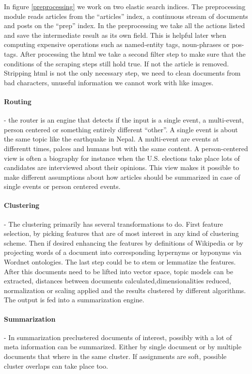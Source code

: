   In figure \ref{preprocessing} we work on two elastic search indices. The preprocessing module reads articles from the ``articles'' index, a continuous stream of documents and posts on the ``prep'' index. In the preprocessing we take all the actions listed and save the intermediate result as its own field. This is helpful later when computing expensive operations such as named-entity tags, noun-phrases or pos-tags. After processing the html we take a second filter step to make sure that the conditions of the scraping steps still hold true. If not the article is removed. Stripping html is not the only necessary step, we need to clean documents from bad characters, unuseful information we cannot work with like images.

  \paragraph{Routing} - the router is an engine that detects if the input is a single event, a multi-event, person centered or something entirely different ``other''. A single event is about the same topic like the earthquake in Nepal. A multi-event are events at differentt times, palces and humans but with the same content. A person-centered view is often a biography for instance when the U.S. elections take place lots of candidates are interviewed about their opinions. This view makes it possible to make different assumptions about how articles should be summarized in case of single events or person centered events.

  \paragraph{Clustering} - The clustering primarily has several transformations to do. First  feature selection, by picking features that are of most interest in any kind of clustering scheme. Then if desired enhancing the features by definitions of Wikipedia or by projecting words of a document into corresponding hypernyms or hyponyms via Wordnet ontologies. The last step could be to stem or lemmatize the features. After this documents need to be lifted into vector space, topic models can be extracted, distances between documents calculated,dimensionalities reduced, normalization or scaling applied and the results clustered by different algorithms. The output is fed into a summarization engine.

  \paragraph{Summarization} - In summarization preclustered documents of interest, possibly with a lot of meta information can be summarized. Either by single document or by multiple documents that where in the same cluster. If assignments are soft, possible cluster overlaps can take place too. 

